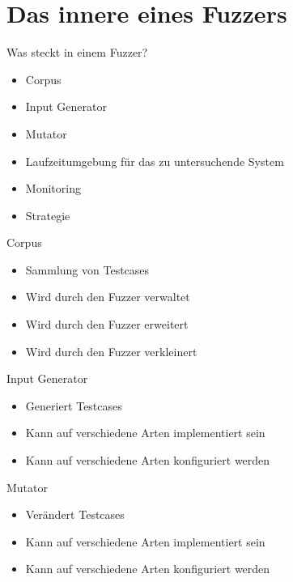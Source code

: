 
\section{Das innere eines Fuzzers}\label{sec:das-innere-eines-fuzzers}
\begin{frame}{Was steckt in einem Fuzzer?}
    \begin{itemize}
        \item \alert{Corpus}
        \item Input Generator
        \item Mutator
        \item Laufzeitumgebung für das zu untersuchende System
        \item Monitoring
        \item \alert{Strategie}
    \end{itemize}
\end{frame}
\begin{frame}{Corpus}
    \begin{itemize}
        \item Sammlung von Testcases
        \item Wird durch den Fuzzer verwaltet
        \item Wird durch den Fuzzer erweitert
        \item Wird durch den Fuzzer verkleinert
    \end{itemize}
\end{frame}
\begin{frame}{Input Generator}
    \begin{itemize}
        \item Generiert Testcases
        \item Kann auf verschiedene Arten implementiert sein
        \item Kann auf verschiedene Arten konfiguriert werden
    \end{itemize}
\end{frame}
\begin{frame}{Mutator}
    \begin{itemize}
        \item Verändert Testcases
        \item Kann auf verschiedene Arten implementiert sein
        \item Kann auf verschiedene Arten konfiguriert werden
    \end{itemize}
\end{frame}
